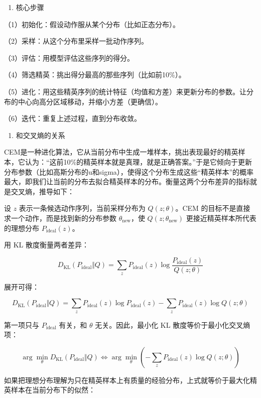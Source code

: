 \begin{enumerate}
\def\labelenumi{\arabic{enumi}.}
\tightlist
\item
  核心步骤
\end{enumerate}

（1）初始化：假设动作服从某个分布（比如正态分布）。

（2）采样：从这个分布里采样一批动作序列。

（3）评估：用模型评估这些序列的得分。

（4）筛选精英：挑出得分最高的那些序列（比如前10\%）。

（5）进化：用这些精英序列的统计特征（均值和方差）来更新分布的参数。让分布的中心向高分区域移动，并缩小方差（更确信）。

（6）迭代：重复上述过程，直到分布收敛。

\begin{enumerate}
\def\labelenumi{\arabic{enumi}.}
\setcounter{enumi}{1}
\tightlist
\item
  和交叉熵的关系
\end{enumerate}

CEM是一种进化算法，它从当前分布中生成一堆样本，挑出表现最好的精英样本，它认为：``这前10\%的精英样本就是真理，就是正确答案。''于是它倾向于更新分布参数（比如高斯分布的u和sigma），使得这个分布生成这些``精英样本''的概率最大，即我们让当前的分布去拟合精英样本的分布。衡量这两个分布差异的指标就是交叉熵，推导如下：

设 \(z\) 表示一条候选动作序列，当前采样分布为 \(Q(z;\theta)\)。CEM 的目标不是直接求一个动作，而是找到新的分布参数 \(\theta_{\mathrm{new}}\)，使 \(Q(z;\theta_{\mathrm{new}})\) 更接近精英样本所代表的理想分布 \(P_{\mathrm{ideal}}(z)\)。

用 KL 散度衡量两者差异：

\[
D_{\mathrm{KL}}(P_{\mathrm{ideal}}\Vert Q)
=\sum_z P_{\mathrm{ideal}}(z)\log\frac{P_{\mathrm{ideal}}(z)}{Q(z;\theta)}
\]

展开可得：

\[
D_{\mathrm{KL}}(P_{\mathrm{ideal}}\Vert Q)
=\sum_z P_{\mathrm{ideal}}(z)\log P_{\mathrm{ideal}}(z)
-\sum_z P_{\mathrm{ideal}}(z)\log Q(z;\theta)
\]

第一项只与 \(P_{\mathrm{ideal}}\) 有关，和 \(\theta\) 无关。因此，最小化 KL 散度等价于最小化交叉熵项：

\[
\arg\min_\theta D_{\mathrm{KL}}(P_{\mathrm{ideal}}\Vert Q)
\Longleftrightarrow
\arg\min_\theta\left(-\sum_z P_{\mathrm{ideal}}(z)\log Q(z;\theta)\right)
\]

如果把理想分布理解为只在精英样本上有质量的经验分布，上式就等价于最大化精英样本在当前分布下的似然：

